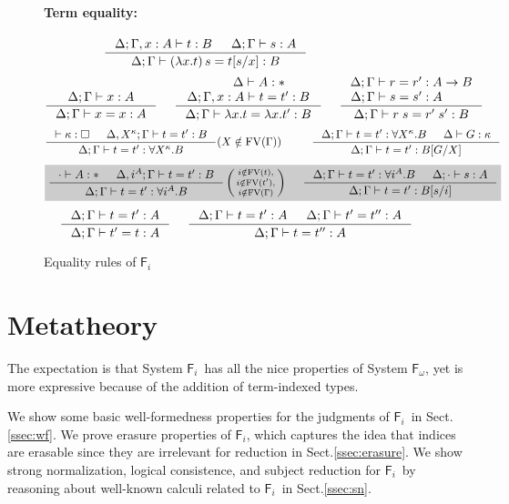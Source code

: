 \documentclass{llncs}
\newcommand{\newFi}[1]{\colorbox{grey}{\ensuremath{#1}}}
\newcommand{\Fi}{\ensuremath{\mathsf{F}_i}}
\newcommand{\Fw}{\ensuremath{\mathsf{F}_\omega}}
\newcommand{\FV}{\mathop{\mathrm{FV}}}
\renewcommand{\S}[0]{Sect.\;}
\begin{document}
\begin{figure}
\paragraph{Term equality:} ~~ 
$ \qquad
 ~~~~
   \inference{\Delta;\Gamma,x:A |- t:B & \Delta;\Gamma |- s:A}
             {\Delta;\Gamma |- (\lambda x.t)\,s=t[s/x] : B} $
\[
   \inference{\Delta;\Gamma |- x:A}{\Delta;\Gamma |- x=x:A}
 ~~~~
   \inference{\quad~~ \Delta |- A:* \\ \Delta;\Gamma,x:A |- t=t':B}
             {\Delta;\Gamma |- \lambda x.t = \lambda x.t':B}
 ~~~~
   \inference{\Delta;\Gamma |- r=r':A-> B \\ \Delta;\Gamma |- s=s':A \qquad~}
             {\Delta;\Gamma |- r\;s=r'\;s':B}
\]
\[ \inference{|- \kappa:\square & \Delta, X^\kappa;\Gamma |- t=t' : B}
             {\Delta;\Gamma |- t=t' : \forall X^\kappa.B}
	     (X\notin\FV(\Gamma))
 ~~~~ ~~~~
   \inference{ \Delta;\Gamma |- t=t' : \forall X^\kappa.B
             & \Delta |- G:\kappa }
             {\Delta;\Gamma |- t=t' : B[G/X]}
\]
\[ \newFi{
   \inference{\cdot |- A:* & \Delta, i^A;\Gamma |- t=t' : B}
             {\Delta;\Gamma |- t=t' : \forall i^A.B}
   \left(\begin{smallmatrix}
		i\notin\FV(t),\\
		i\notin\FV(t'),\\
		i\notin\FV(\Gamma)\end{smallmatrix}\right)
 ~~~~
   \inference{ \Delta;\Gamma |- t=t' : \forall i^A.B
             & \Delta;\cdot |- s:A}
             {\Delta;\Gamma |- t=t' : B[s/i]} }
\]
\[ \inference{\Delta;\Gamma |- t=t':A}{\Delta;\Gamma |- t'=t:A}
 ~~~~
   \inference{\Delta;\Gamma |- t=t':A & \Delta;\Gamma |- t'=t'':A}
             {\Delta;\Gamma |- t=t'':A}
\]
\caption{Equality rules of \Fi}
\label{fig:eqFi}
\end{figure}

\section{Metatheory} \label{sec:theory}

The expectation is that System \Fi\ has all the nice properties of System \Fw,
yet is more expressive because of the addition of term-indexed types.

We show some basic well-formedness properties for
the judgments of \Fi\ in \S\ref{ssec:wf}.
We prove erasure properties of \Fi, which captures the idea that indices are
erasable since they are irrelevant for reduction in \S\ref{ssec:erasure}.
We show strong normalization, logical consistence, and subject reduction for
\Fi\ by reasoning about well-known calculi related to \Fi\ in \S\ref{ssec:sn}.
\end{document}
